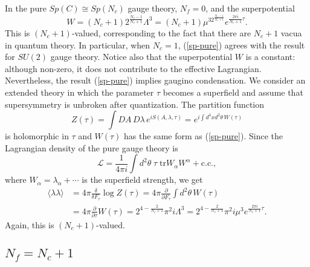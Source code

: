 \documentclass[lecture]{qft-l}
\newcommand{\al}{\alpha}
\newcommand{\del}{\delta}
\newcommand{\lam}{\lambda}
\newcommand{\tht}{\theta}
\newcommand{\Lam}{\varLambda}
\newcommand{\bra}{\langle}
\newcommand{\ket}{\rangle}
\newcommand{\inv}[1]{\frac{1}{#1}}
\newcommand{\e}[1]{e^{{#1}}}
\newcommand{\ii}{i}
\newcommand{\dr}{d}
\newcommand{\pdr}{\partial}
\newcommand{\tr}{\mathrm{tr}}
\newcommand{\cc}{\mathrm{c.c.}}
\newcommand{\LL}{{\mathcal L}}
\def\Subhead#1{\subsection*{#1}}
\begin{document}
In the pure $Sp(C)\cong Sp(N_c)$ gauge theory, $N_f=0$, and the superpotential
	\begin{equation}\label{sp-pure}
W=(N_c+1)2^{\frac{N_c-1}{N_c+1}}\Lam^3
=(N_c+1)\mu^32^{\frac{N_c-1}{N_c+1}}\e{\frac{2\pi\ii}{N_c+1}\tau}.
	\end{equation}
This is $(N_c+1)$-valued, corresponding to the fact
that there are $N_c+1$ vacua in quantum theory.
In particular, when $N_c=1$, (\ref{sp-pure}) agrees with the result for
$SU(2)$ gauge theory.
Notice also that the superpotential $W$ is a constant:
although non-zero, it does not contribute to the effective Lagrangian.
Nevertheless, the result (\ref{sp-pure}) implies gaugino condensation.
We consider an extended theory in which the parameter $\tau$ becomes 
a superfield and assume that supersymmetry is unbroken after quantization.
The partition function
	\begin{equation}
Z(\tau)=\int DA\,D\lam\,\e{\ii S(A,\lam,\tau)}
=\e{\ii\int\dr^4x\dr^2\tht\,W(\tau)}
	\end{equation}
is holomorphic in $\tau$ and $W(\tau)$ has the same form as (\ref{sp-pure}).
Since the Lagrangian density of the pure gauge theory is
	\begin{equation}
\LL=\inv{4\pi\ii}\int\dr^2\tht\;\tau\;\tr W_\al W^\al+\cc,
	\end{equation}
where $W_\al=\lam_\al+\cdots$ is the superfield strength, we get
\begin{equation}
\begin{aligned}
\bra\lam\lam\ket &=4\pi\frac{\del}{\del F_\tau}\log Z(\tau)
=4\pi\frac{\pdr}{\pdr F_\tau}\int\dr^2\tht\,W(\tau)\\
&=4\pi\frac{\pdr}{\pdr\tau}W(\tau)
=2^{4-\frac{2}{N_c+1}}\pi^2\ii\Lam^3
=2^{4-\frac{2}{N_c+1}}\pi^2\ii\mu^3\e{\frac{2\pi\ii}{N_c+1}\tau}.
\end{aligned}
\end{equation}
Again, this is $(N_c+1)$-valued.


\Subhead{{\boldmath $N_f=N_c+1$}}
\end{document}
